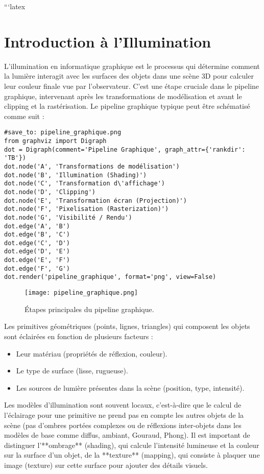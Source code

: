 ```latex

\sloppy
\section{Introduction à l'Illumination}
L'illumination en informatique graphique est le processus qui détermine comment la lumière interagit avec les surfaces des objets dans une scène 3D pour calculer leur couleur finale vue par l'observateur. C'est une étape cruciale dans le pipeline graphique, intervenant après les transformations de modélisation et avant le clipping et la rastérisation.
Le pipeline graphique typique peut être schématisé comme suit :
\begin{verbatim}
#save_to: pipeline_graphique.png
from graphviz import Digraph
dot = Digraph(comment='Pipeline Graphique', graph_attr={'rankdir': 'TB'})
dot.node('A', 'Transformations de modélisation')
dot.node('B', 'Illumination (Shading)')
dot.node('C', 'Transformation d\'affichage')
dot.node('D', 'Clipping')
dot.node('E', 'Transformation écran (Projection)')
dot.node('F', 'Pixelisation (Rasterization)')
dot.node('G', 'Visibilité / Rendu')
dot.edge('A', 'B')
dot.edge('B', 'C')
dot.edge('C', 'D')
dot.edge('D', 'E')
dot.edge('E', 'F')
dot.edge('F', 'G')
dot.render('pipeline_graphique', format='png', view=False)
\end{verbatim}
\begin{figure}[H]
\centering
\texttt{[image: pipeline\_graphique.png]}
\caption{Étapes principales du pipeline graphique.}
\label{fig:pipeline_graphique}
\end{figure}
Les primitives géométriques (points, lignes, triangles) qui composent les objets sont éclairées en fonction de plusieurs facteurs :
\begin{itemize}
    \item Leur matériau (propriétés de réflexion, couleur).
    \item Le type de surface (lisse, rugueuse).
    \item Les sources de lumière présentes dans la scène (position, type, intensité).
\end{itemize}
Les modèles d'illumination sont souvent locaux, c'est-à-dire que le calcul de l'éclairage pour une primitive ne prend pas en compte les autres objets de la scène (pas d'ombres portées complexes ou de réflexions inter-objets dans les modèles de base comme diffus, ambiant, Gouraud, Phong).
Il est important de distinguer l'**ombrage** (shading), qui calcule l'intensité lumineuse et la couleur sur la surface d'un objet, de la **texture** (mapping), qui consiste à plaquer une image (texture) sur cette surface pour ajouter des détails visuels.
